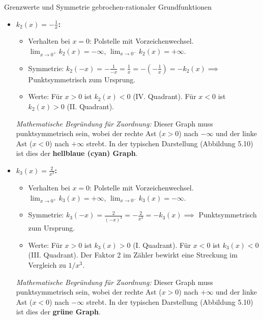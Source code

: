 \begin{loesungsumgebung}{Grenzwerte und Symmetrie gebrochen-rationaler Grundfunktionen}
\begin{enumerate}[label=(\alph*)]
\begin{itemize}
        \item \textbf{$k_2(x) = -\frac{1}{x}$:}
        \begin{itemize}
            \item Verhalten bei $x=0$: Polstelle mit Vorzeichenwechsel. $\lim_{x \to 0^+} k_2(x) = -\infty$, $\lim_{x \to 0^-} k_2(x) = +\infty$.
            \item Symmetrie: $k_2(-x) = -\frac{1}{-x} = \frac{1}{x} = -(-\frac{1}{x}) = -k_2(x) \implies$ Punktsymmetrisch zum Ursprung.
            \item Werte: Für $x>0$ ist $k_2(x)<0$ (IV. Quadrant). Für $x<0$ ist $k_2(x)>0$ (II. Quadrant).
        \end{itemize}
        \textit{Mathematische Begründung für Zuordnung:} Dieser Graph muss punktsymmetrisch sein, wobei der rechte Ast ($x>0$) nach $-\infty$ und der linke Ast ($x<0$) nach $+\infty$ strebt.
        In der typischen Darstellung (Abbildung 5.10) ist dies der \textbf{hellblaue (cyan) Graph}.

        \item \textbf{$k_3(x) = \frac{2}{x^3}$:}
        \begin{itemize}
            \item Verhalten bei $x=0$: Polstelle mit Vorzeichenwechsel. $\lim_{x \to 0^+} k_3(x) = +\infty$, $\lim_{x \to 0^-} k_3(x) = -\infty$.
            \item Symmetrie: $k_3(-x) = \frac{2}{(-x)^3} = -\frac{2}{x^3} = -k_3(x) \implies$ Punktsymmetrisch zum Ursprung.
            \item Werte: Für $x>0$ ist $k_3(x)>0$ (I. Quadrant). Für $x<0$ ist $k_3(x)<0$ (III. Quadrant). Der Faktor 2 im Zähler bewirkt eine Streckung im Vergleich zu $1/x^3$.
        \end{itemize}
        \textit{Mathematische Begründung für Zuordnung:} Dieser Graph muss punktsymmetrisch sein, wobei der rechte Ast ($x>0$) nach $+\infty$ und der linke Ast ($x<0$) nach $-\infty$ strebt.
        In der typischen Darstellung (Abbildung 5.10) ist dies der \textbf{grüne Graph}.


\end{itemize}
\end{enumerate}
\end{loesungsumgebung}
